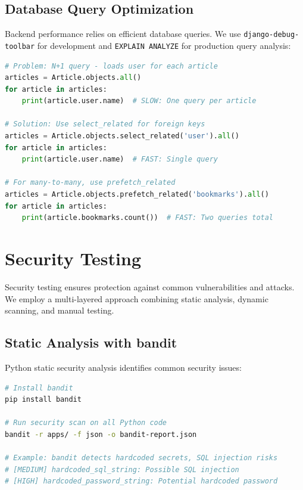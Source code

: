 \documentclass{report}
\begin{document}
\section{Database Query Optimization}

Backend performance relies on efficient database queries. We use \texttt{django-debug-toolbar} for development and \texttt{EXPLAIN ANALYZE} for production query analysis:

\begin{lstlisting}[language=Python, caption=Query optimization example]
# Problem: N+1 query - loads user for each article
articles = Article.objects.all()
for article in articles:
    print(article.user.name)  # SLOW: One query per article

# Solution: Use select_related for foreign keys
articles = Article.objects.select_related('user').all()
for article in articles:
    print(article.user.name)  # FAST: Single query

# For many-to-many, use prefetch_related
articles = Article.objects.prefetch_related('bookmarks').all()
for article in articles:
    print(article.bookmarks.count())  # FAST: Two queries total
\end{lstlisting}


\chapter{Security Testing}

Security testing ensures protection against common vulnerabilities and attacks. We employ a multi-layered approach combining static analysis, dynamic scanning, and manual testing.

\section{Static Analysis with bandit}

Python static security analysis identifies common security issues:

\begin{lstlisting}[language=bash, caption=bandit static security scanning]
# Install bandit
pip install bandit

# Run security scan on all Python code
bandit -r apps/ -f json -o bandit-report.json

# Example: bandit detects hardcoded secrets, SQL injection risks
# [MEDIUM] hardcoded_sql_string: Possible SQL injection
# [HIGH] hardcoded_password_string: Potential hardcoded password
\end{lstlisting}
\end{document}
